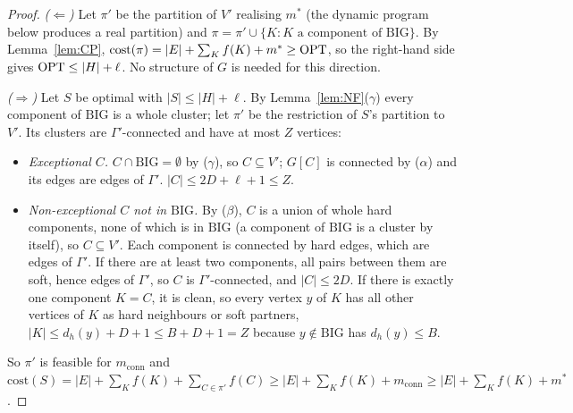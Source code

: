 \begin{proof}
\emph{($\Leftarrow$)} Let $\pi'$ be the partition of $V'$ realising $m^*$ (the dynamic program below produces a real partition) and $\pi=\pi'\cup\{K:K\text{ a component of BIG}\}$. By Lemma~\ref{lem:CP}, $\mathrm{cost}(\pi)=|E|+\sum_Kf(K)+m^*\ge\mathrm{OPT}$, so the right-hand side gives $\mathrm{OPT}\le|H|+\ell$. No structure of $G$ is needed for this direction.

\emph{($\Rightarrow$)} Let $S$ be optimal with $|S|\le|H|+\ell$. By Lemma~\ref{lem:NF}($\gamma$) every component of $\mathrm{BIG}$ is a whole cluster; let $\pi'$ be the restriction of $S$'s partition to $V'$. Its clusters are $\Gamma'$-connected and have at most $Z$ vertices:
\begin{itemize}
\item \emph{Exceptional $C$.} $C\cap\mathrm{BIG}=\emptyset$ by ($\gamma$), so $C\subseteq V'$; $G[C]$ is connected by ($\alpha$) and its edges are edges of $\Gamma'$. $|C|\le2D+\ell+1\le Z$.
\item \emph{Non-exceptional $C$ not in $\mathrm{BIG}$.} By ($\beta$), $C$ is a union of whole hard components, none of which is in $\mathrm{BIG}$ (a component of $\mathrm{BIG}$ is a cluster by itself), so $C\subseteq V'$. Each component is connected by hard edges, which are edges of $\Gamma'$. If there are at least two components, all pairs between them are soft, hence edges of $\Gamma'$, so $C$ is $\Gamma'$-connected, and $|C|\le2D$. If there is exactly one component $K=C$, it is clean, so every vertex $y$ of $K$ has all other vertices of $K$ as hard neighbours or soft partners, $|K|\le d_h(y)+D+1\le B+D+1=Z$ because $y\notin\mathrm{BIG}$ has $d_h(y)\le B$.
\end{itemize}
So $\pi'$ is feasible for $m_{\mathrm{conn}}$ and $\mathrm{cost}(S)=|E|+\sum_Kf(K)+\sum_{C\in\pi'}f(C)\ge|E|+\sum_Kf(K)+m_{\mathrm{conn}}\ge|E|+\sum_Kf(K)+m^*$.


\end{proof}
